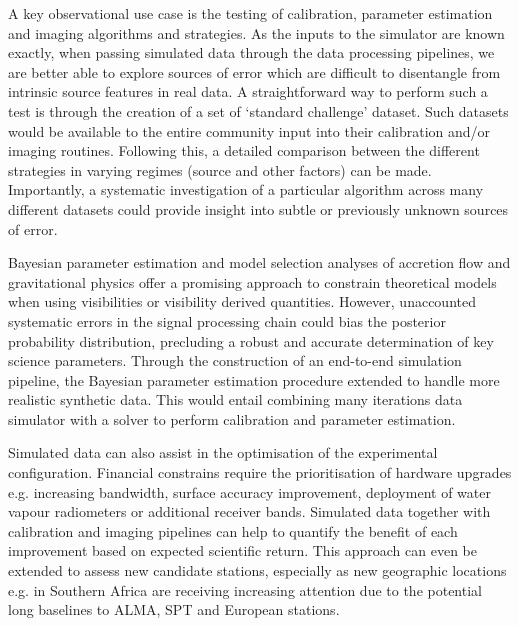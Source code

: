 
A key observational use case is the testing of calibration, parameter estimation and imaging algorithms and strategies. As the inputs to the simulator are known exactly, when passing simulated data through the data processing pipelines, we are better able to explore sources of error which are difficult to disentangle from intrinsic source features in real data.  A straightforward way to perform such a test is through the creation of a set of `standard challenge' dataset. Such datasets would be available to the entire community input into their calibration and/or imaging routines. Following this, a detailed comparison between the different strategies in varying regimes (source and other factors) can be made. Importantly, a systematic investigation of a particular algorithm across many different datasets could provide insight into subtle or previously unknown sources of error.

Bayesian parameter estimation and model selection analyses of accretion flow \citep[e.g.][]{Broderick_2016} and gravitational physics \citep[e.g.][]{Broderick_2014, Psaltis_2016} offer a promising approach to constrain theoretical models when using visibilities or visibility derived quantities. However, unaccounted systematic errors in the signal processing chain could bias  the posterior probability distribution, precluding a robust and accurate determination of key science parameters. Through the construction of an end-to-end simulation pipeline, the Bayesian parameter estimation procedure extended to handle more realistic synthetic data. This would entail combining many iterations data simulator with a solver to perform calibration and parameter estimation. %

Simulated data can also assist in the optimisation of the experimental configuration. Financial constrains require the prioritisation of hardware upgrades e.g. increasing bandwidth, surface accuracy improvement, deployment of water vapour radiometers or additional receiver bands. Simulated data together with calibration and imaging pipelines can help to quantify the benefit of each improvement based on expected scientific return. This approach can even be extended to assess new candidate stations, especially as new geographic locations e.g. in Southern Africa are receiving increasing attention due to the potential long baselines to ALMA, SPT and European stations.

